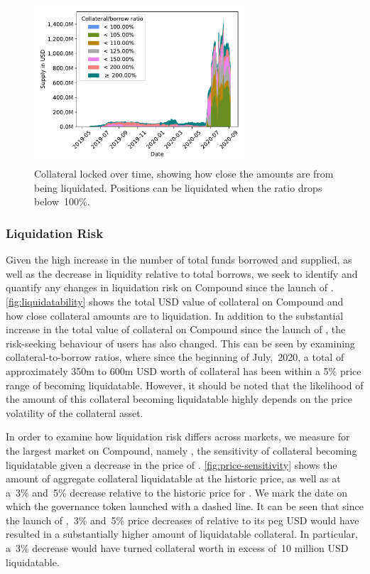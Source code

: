 \begin{figure}[tbp]
  \centering
  \includegraphics[width=0.7\textwidth]{./5b-economic-security/figures/supply-borrow-over-time.pdf}
  \caption[Collateral locked on Compound over time]{Collateral locked over time, showing how close the amounts are from being liquidated. Positions can be liquidated when the ratio drops below~100\%.}
  \label{fig:liquidatability}
\end{figure}

\subsubsection{Liquidation Risk}
Given the high increase in the number of total funds borrowed and supplied, as well as the decrease in liquidity relative to total borrows, we seek to identify and quantify any changes in liquidation risk on Compound since the launch of . 
\autoref{fig:liquidatability} shows the total USD value of collateral on Compound and how close collateral amounts are to liquidation. 
In addition to the substantial increase in the total value of collateral on Compound since the launch of , the risk-seeking behaviour of users has also changed.
This can be seen by examining collateral-to-borrow ratios, where since the beginning of July,~2020, a total of approximately 350m to 600m USD worth of collateral has been within a 5\% price range of becoming liquidatable.
However, it should be noted that the likelihood of the amount of this collateral becoming liquidatable highly depends on the price volatility of the collateral asset.

In order to examine how liquidation risk differs across markets, we measure for the largest market on Compound, namely , the sensitivity of collateral becoming liquidatable given a decrease in the price of .
\autoref{fig:price-sensitivity} shows the amount of aggregate collateral liquidatable at the historic price, as well as at a~3\% and~5\% decrease relative to the historic price for .
We mark the date on which the  governance token launched with a dashed line.
It can be seen that since the launch of ,~3\% and~5\% price decreases of  relative to its peg USD would have resulted in a substantially higher amount of liquidatable collateral.
In particular, a~3\% decrease would have turned collateral worth in excess of~10 million USD liquidatable.

